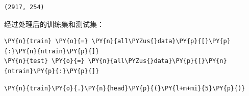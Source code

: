 \documentclass[no-math]{YangThesis}
\begin{document}
\begin{Verbatim}[commandchars=\\\{\}]
(2917, 254)
\end{Verbatim}

经过处理后的训练集和测试集：

\begin{tcolorbox}[breakable, size=fbox, boxrule=1pt, pad at break*=1mm,colback=cellbackground, colframe=cellborder]
	\begin{Verbatim}[commandchars=\\\{\}]
\PY{n}{train} \PY{o}{=} \PY{n}{all\PYZus{}data}\PY{p}{[}\PY{p}{:}\PY{n}{ntrain}\PY{p}{]}
\PY{n}{test} \PY{o}{=} \PY{n}{all\PYZus{}data}\PY{p}{[}\PY{n}{ntrain}\PY{p}{:}\PY{p}{]}
	\end{Verbatim}
\end{tcolorbox}

\begin{tcolorbox}[breakable, size=fbox, boxrule=1pt, pad at break*=1mm,colback=cellbackground, colframe=cellborder]
	\begin{Verbatim}[commandchars=\\\{\}]
\PY{n}{train}\PY{o}{.}\PY{n}{head}\PY{p}{(}\PY{l+m+mi}{5}\PY{p}{)}
	\end{Verbatim}
\end{tcolorbox}
\end{document}
